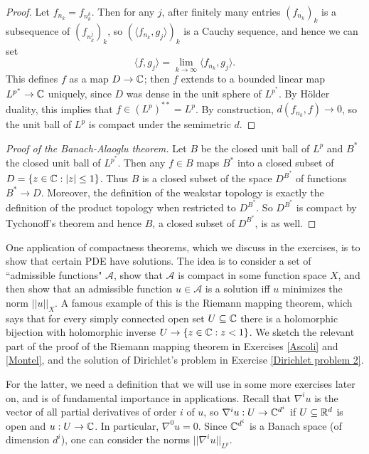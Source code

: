 \begin{proof}
Let $f_{n_k} = f_{n_k^k}$. Then for any $j$, after finitely many entries $(f_{n_k})_k$ is a subsequence of $(f_{n_k^j})_k$, so $(\langle f_{n_k}, g_j\rangle)_k$ is a Cauchy sequence, and hence we can set
\[\langle f, g_j\rangle = \lim_{k \to \infty} \langle f_{n_k}, g_j\rangle.\]
This defines $f$ as a map $D \to \mathbb{C}$; then $f$ extends to a bounded linear map $L^{p^*} \to \mathbb{C}$ uniquely, since $D$ was dense in the unit sphere of $L^{p^*}$.
By H\"older duality, this implies that $f \in (L^p)^{**} = L^p$.
By construction, $d(f_{n_k}, f) \to 0$, so the unit ball of $L^p$ is compact under the semimetric $d$.
\end{proof}

\begin{proof}[Proof of the Banach-Alaoglu theorem]
Let $B$ be the closed unit ball of $L^p$ and $B^*$ the closed unit ball of $L^{p^*}$.
Then any $f \in B$ maps $B^*$ into a closed subset of $D = \{z \in \mathbb{C}: |z| \leq 1\}$.
Thus $B$ is a closed subset of the space $D^{B^*}$ of functions $B^* \to D$.
Moreover, the definition of the weakstar topology is exactly the definition of the product topology when restricted to $D^{B^*}$.
So $D^{B^*}$ is compact by Tychonoff's theorem and hence $B$, a closed subset of $D^{B^*}$, is as well.
\end{proof}

One application of compactness theorems, which we discuss in the exercises, is to show that certain PDE have solutions.
The idea is to consider a set of ``admissible functions" $\mathcal A$, show that $\mathcal A$ is compact in some function space $X$, and then show that an admissible function $u \in \mathcal A$ is a solution iff $u$ minimizes the norm $||u||_X$.
A famous example of this is the Riemann mapping theorem, which says that for every simply connected open set $U \subseteq \mathbb{C}$ there is a holomorphic bijection with holomorphic inverse $U \to \{z \in \mathbb{C}: z < 1\}$.
We sketch the relevant part of the proof of the Riemann mapping theorem in Exercises \ref{Ascoli} and \ref{Montel}, and the solution of Dirichlet's problem in Exercise \ref{Dirichlet problem 2}.

For the latter, we need a definition that we will use in some more exercises later on, and is of fundamental importance in applications.
Recall that $\nabla^iu$ is the vector of all partial derivatives of order $i$ of $u$, so $\nabla^iu: U \to \mathbb{C}^{d^i}$ if $U \subseteq \mathbb{R}^d$ is open and $u: U \to \mathbb{C}$.
In particular, $\nabla^0u = 0$.
Since $\mathbb{C}^{d^i}$ is a Banach space (of dimension $d^i$), one can consider the norms $||\nabla^iu||_{L^p}$.

